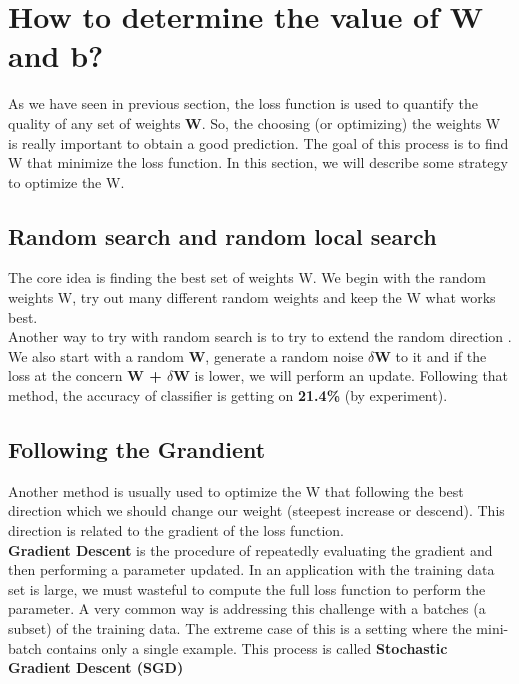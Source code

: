 \section{How to determine the value of W and b?}
As we have seen in previous section, the loss function is used to quantify the quality of any set of weights \textbf{W}. So, the choosing (or optimizing) the weights W is really important to obtain a good prediction. The goal of this process is to find W that minimize the loss function. In this section, we will describe some strategy to optimize the W.
	\subsection{Random search and random local search}
	The core idea is finding the best set of weights W. We begin with the random weights W, try out many different random weights and keep the W what works best.\\[0.2cm]
	Another way to try with random search is to try to extend the random direction . We also start with a random \textbf{W}, generate a random noise \textbf{$\delta$W} to it and if the loss at the concern \textbf{W + $\delta$W} is lower, we will perform an update. Following that method, the accuracy of classifier is getting on \textbf{21.4\%} (by experiment).
	\subsection{Following the Grandient}
	Another method is usually used to optimize the W that following the best direction which we should change our weight (steepest increase or descend). This direction is related to the gradient of the loss function. \\[0.2cm]
	\textbf{Gradient Descent} is the procedure of repeatedly evaluating the gradient and then performing a parameter updated. In an application with the training data set is large, we must wasteful to compute the full loss function to perform the parameter. A very common way is addressing this challenge with a batches (a subset) of the training data. The extreme case of this is a setting where the mini-batch contains only a single example. This process is called \textbf{Stochastic Gradient Descent (SGD)}
